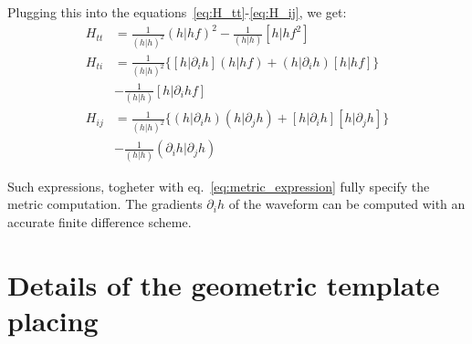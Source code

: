 \documentclass[twocolumn,showpacs,preprintnumbers,nofootinbib,prd,
superscriptaddress,10pt]{revtex4-1}
\newcommand{\rescalar}[2]{( #1|#2 )}
\newcommand{\imscalar}[2]{[ #1|#2 ]}
\begin{document}
Plugging this into the equations~\eqref{eq:H_tt}-\eqref{eq:H_ij}, we get:
\begin{align}
	H_{tt} &= \frac{1}{\rescalar{h}{h}^{2}} \rescalar{{h}}{{h}f}^2 - \frac{1}{\rescalar{h}{h}} \imscalar{h}{{h} f^2 }\\
	H_{ti} &= \frac{1}{\rescalar{h}{h}^{2}} \Big\{ \imscalar{h}{\partial_i {h}} \rescalar{{h}}{{h}f} +\rescalar{h}{\partial_i {h}} \imscalar{h}{hf} \Big\} \nonumber \\
	&- \frac{1}{\rescalar{h}{h}} \imscalar{h}{\partial_i{h} f }\\
	H_{ij} &=  \frac{1}{\rescalar{h}{h}^{2}} \Big\{ \rescalar{h}{\partial_i {h}} \rescalar{{h}}{\partial_j {h}} +\imscalar{h}{\partial_i {h}} \imscalar{h}{\partial_j {h}} \Big\} \nonumber \\
	&- \frac{1}{\rescalar{h}{h}} \rescalar{\partial_i h}{\partial_j {h}}
\end{align}

Such expressions, togheter with eq.~\eqref{eq:metric_expression} fully specify the metric computation.
The gradients $\partial_i h$ of the waveform can be computed with an accurate finite difference scheme.



\section{Details of the geometric template placing}\label{app:placing}

\blindtext
\blindtext
	
	
\end{document}
